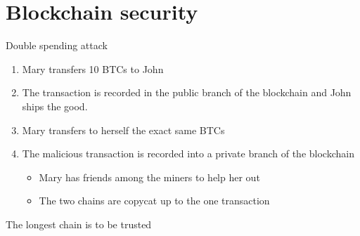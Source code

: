 \documentclass{beamer}
\begin{document}
\section{Blockchain security}
\begin{frame}{Double spending attack}
\scriptsize
\begin{enumerate}
\item Mary transfers 10 BTCs to John
\item The transaction is recorded in the public branch of the blockchain and John ships the good.
\item Mary transfers to herself the exact same BTCs
\item The malicious transaction is recorded into a private branch of the blockchain
\begin{itemize}
  \scriptsize
\item Mary has friends among the miners to help her out
\item The two chains are copycat up to the one transaction
\end{itemize}
\end{enumerate}
\begin{tcolorbox}[enhanced,drop shadow, title=Fact (Bitcoin has only one rule)]
The longest chain is to be trusted
\end{tcolorbox}
\end{frame}
\end{document}
